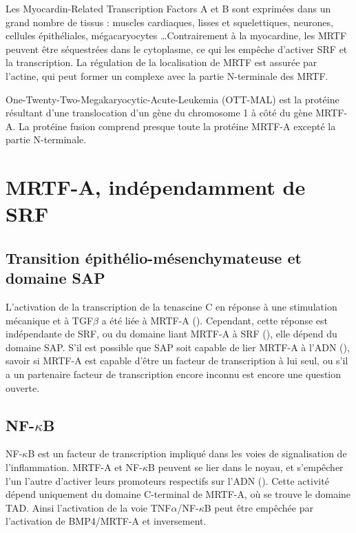 \documentclass{report}
\begin{document}
Les Myocardin-Related Transcription Factors A et B sont exprimées dans un grand nombre de tissus : muscles cardiaques, lisses et squelettiques, neurones, cellules épithéliales, mégacaryocytes \dots Contrairement à la myocardine, les MRTF peuvent être séquestrées dans le cytoplasme, ce qui les empêche d'activer SRF et la transcription. La régulation de la localisation de MRTF est assurée par l'actine, qui peut former un complexe avec la partie N-terminale des MRTF. 

One-Twenty-Two-Megakaryocytic-Acute-Leukemia (OTT-MAL) est la protéine résultant d'une translocation d'un gène du chromosome 1 à côté du gène MRTF-A. La protéine fusion comprend presque toute la protéine MRTF-A excepté la partie N-terminale. 


\section{MRTF-A, indépendamment de SRF}

\subsection{Transition épithélio-mésenchymateuse et domaine SAP}

L'activation de la transcription de la tenascine C en réponse à une stimulation mécanique et à TGF$\beta$ a été liée à MRTF-A (\cite{maier_tenascin-c_2008}). Cependant, cette réponse est indépendante de SRF, ou du domaine liant MRTF-A à SRF (\cite{asparuhova_transcriptional_2011}), elle dépend du domaine SAP. 
S'il est possible que SAP soit capable de lier MRTF-A à l'ADN (\cite{aravind_sapputative_2000}), savoir si MRTF-A est capable d'être un facteur de transcription à lui seul, ou s'il a un partenaire facteur de transcription encore inconnu est encore une question ouverte. 


\subsection{NF-$\kappa$B}

NF-$\kappa$B est un facteur de transcription impliqué dans les voies de signalisation de l'inflammation. MRTF-A et NF-$\kappa$B peuvent se lier dans le noyau, et s'empêcher l'un l'autre d'activer leurs promoteurs respectifs sur l'ADN (\cite{wang_bone_2012}). 
Cette activité dépend uniquement du domaine C-terminal de MRTF-A, où se trouve le domaine TAD. 
Ainsi l'activation de la voie TNF$\alpha$/NF-$\kappa$B peut être empêchée par l'activation de BMP4/MRTF-A et inversement. 
\end{document}
